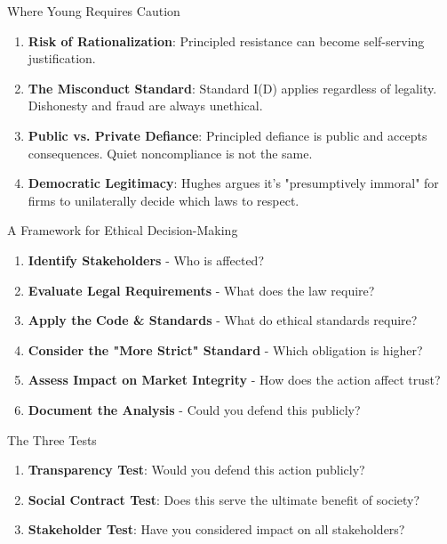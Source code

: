 \documentclass{beamer}
\begin{document}
	\begin{frame}{Where Young Requires Caution}
		\begin{enumerate}
			\item \textbf{Risk of Rationalization}: Principled resistance can become self-serving justification.
			\item \textbf{The Misconduct Standard}: Standard I(D) applies regardless of legality. Dishonesty and fraud are always unethical.
			\item \textbf{Public vs. Private Defiance}: Principled defiance is \textcolor{cfablue}{public} and accepts consequences. Quiet noncompliance is not the same.
			\item \textbf{Democratic Legitimacy}: Hughes argues it's "presumptively immoral" for firms to unilaterally decide which laws to respect.
		\end{enumerate}
		\vspace{0.2cm}
		\begin{center}
		\end{center}
	\end{frame}
	
	\begin{frame}{A Framework for Ethical Decision-Making}
		\small
		\begin{enumerate}
			\item \textbf{Identify Stakeholders} - Who is affected?
			\item \textbf{Evaluate Legal Requirements} - What does the law require?
			\item \textbf{Apply the Code \& Standards} - What do ethical standards require?
			\item \textbf{Consider the "More Strict" Standard} - Which obligation is higher?
			\item \textbf{Assess Impact on Market Integrity} - How does the action affect trust?
			\item \textbf{Document the Analysis} - Could you defend this publicly?
		\end{enumerate}
		
		\vspace{0.2cm}
		\begin{block}{The Three Tests}
			\begin{enumerate}
				\item \textbf{Transparency Test}: Would you defend this action publicly?
				\item \textbf{Social Contract Test}: Does this serve the ultimate benefit of society?
				\item \textbf{Stakeholder Test}: Have you considered impact on all stakeholders?
			\end{enumerate}
		\end{block}
	\end{frame}
	
\end{document}
